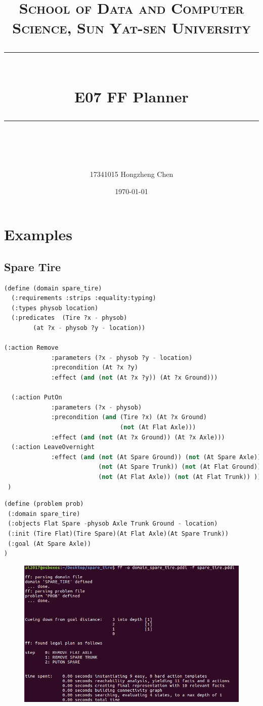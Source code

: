 ﻿\documentclass[a4paper, 11pt]{article}
\title{
\normalfont \normalsize
\textsc{School of Data and Computer Science, Sun Yat-sen University} \\ [25pt] %
\rule{\textwidth}{0.5pt} \\[0.4cm] %
\huge  E07 FF Planner \\ %
\rule{\textwidth}{2pt} \\[0.5cm] %
\author{17341015 Hongzheng Chen}
\date{\normalsize\today}
}
\begin{document}
\maketitle
\tableofcontents
\newpage

\section{Examples}

\subsection{Spare Tire}
\begin{lstlisting}[title=domain\_spare\_tire.pddl,language=lisp]
(define (domain spare_tire)
  (:requirements :strips :equality:typing)
  (:types physob location)
  (:predicates  (Tire ?x - physob)
		(at ?x - physob ?y - location))

(:action Remove
             :parameters (?x - physob ?y - location)
             :precondition (At ?x ?y)
             :effect (and (not (At ?x ?y)) (At ?x Ground)))

  (:action PutOn
             :parameters (?x - physob)
             :precondition (and (Tire ?x) (At ?x Ground)
                                (not (At Flat Axle)))
             :effect (and (not (At ?x Ground)) (At ?x Axle)))
  (:action LeaveOvernight
             :effect (and (not (At Spare Ground)) (not (At Spare Axle))
                          (not (At Spare Trunk)) (not (At Flat Ground))
                          (not (At Flat Axle)) (not (At Flat Trunk)) ))
 )

\end{lstlisting}
\begin{lstlisting}[title=spare\_tire.pddl,language=lisp]
(define (problem prob)
 (:domain spare_tire)
 (:objects Flat Spare -physob Axle Trunk Ground - location)
 (:init (Tire Flat)(Tire Spare)(At Flat Axle)(At Spare Trunk))
 (:goal (At Spare Axle))
)
\end{lstlisting}
\begin{figure}[H]
  \centering
  \includegraphics[width=16cm]{fig/spare_tire}
\end{figure}
\end{document}
